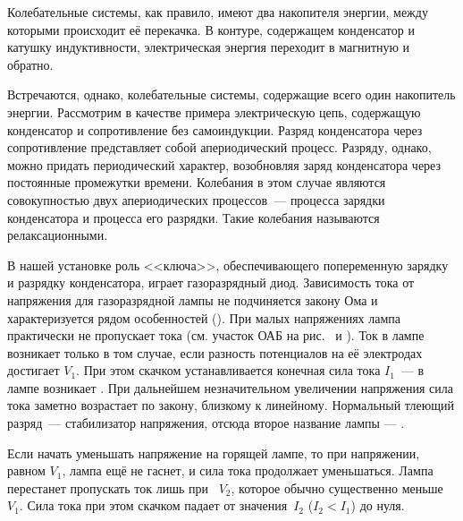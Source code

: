 


Колебательные системы, как правило, имеют два накопителя энергии, между которыми происходит её перекачка. В контуре,
содержащем конденсатор и катушку индуктивности, электрическая энергия переходит в магнитную и обратно.


Встречаются, однако, колебательные системы, содержащие всего один накопитель энергии. Рассмотрим в качестве примера
электрическую цепь, содержащую конденсатор и сопротивление без самоиндукции. Разряд конденсатора через сопротивление
представляет собой апериодический процесс. Разряду, однако, можно придать периодический характер, возобновляя заряд
конденсатора через постоянные промежутки времени. Колебания в этом случае являются совокупностью двух апериодических
процессов~--- процесса зарядки конденсатора и процесса его разрядки. Такие колебания называются релаксационными.

В нашей установке роль <<ключа>>, обеспечивающего попеременную зарядку и разрядку конденсатора, играет газоразрядный
диод. Зависимость тока от напряжения для газоразрядной лампы не подчиняется закону Ома и характеризуется рядом
особенностей (). При малых напряжениях лампа практически не пропускает тока (см. участок ОАБ на рис.~ и
). Ток в лампе возникает только в том случае, если разность потенциалов на её электродах достигает
 $V_1$. При этом скачком устанавливается конечная сила тока $I_1$~--- в лампе возникает
. При дальнейшем незначительном увеличении напряжения сила тока заметно возрастает по
закону, близкому к линейному. Нормальный тлеющий разряд~--- стабилизатор напряжения, отсюда второе название лампы ---
.


Если начать уменьшать напряжение на горящей лампе, то при напряжении, равном $V_1$, лампа ещё не гаснет, и сила тока
продолжает уменьшаться. Лампа перестанет пропускать ток лишь при ~$V_2$, которое обычно
существенно меньше $V_1$. Сила тока при этом скачком падает от значения~$I_2$ ($I_2<I_1$) до нуля.

